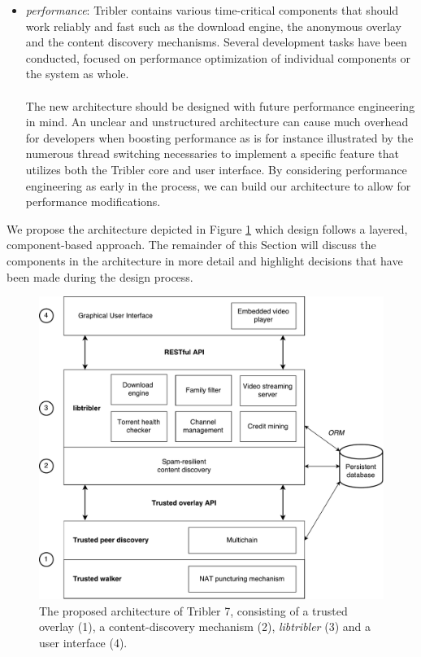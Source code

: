 \begin{itemize}
	\item \emph{performance}: Tribler contains various time-critical components that should work reliably and fast such as the download engine, the anonymous overlay and the content discovery mechanisms. Several development tasks have been conducted, focused on performance optimization of individual components or the system as whole.\\\\
	The new architecture should be designed with future performance engineering in mind. An unclear and unstructured architecture can cause much overhead for developers when boosting performance as is for instance illustrated by the numerous thread switching necessaries to implement a specific feature that utilizes both the Tribler core and user interface. By considering performance engineering as early in the process, we can build our architecture to allow for performance modifications.
\end{itemize}
We propose the architecture depicted in Figure \ref{fig:tribler7} which design follows a layered, component-based approach. The remainder of this Section will discuss the components in the architecture in more detail and highlight decisions that have been made during the design process.

\begin{figure}[h!]
	\centering
	\includegraphics[width=0.9\columnwidth]{images/architecture/tribler7}
	\caption{The proposed architecture of Tribler 7, consisting of a trusted overlay (1), a content-discovery mechanism (2), \emph{libtribler} (3) and a user interface (4).}
	\label{fig:tribler7}
\end{figure}

